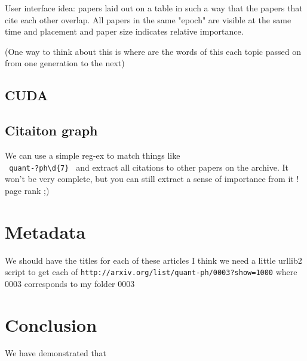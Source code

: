 \documentclass[11pt]{article}
\begin{document}
		User interface idea: papers laid out on a table in such a way that the papers that
		cite each other overlap. All papers in the same "epoch" are visible at the same time
		and placement and paper size indicates relative importance.
		
		(One way to think about this is where are the words of this each topic passed on from one generation
		to the next)
		 
		
	\subsection{CUDA }
			
    \subsection{Citaiton graph}
        We can use a simple reg-ex to match things like \\
        \verb| quant-?ph\d{7} | and extract all citations to other
        papers on the archive.
        It won't be very complete, but you can still extract a sense 
        of importance from it !
        page rank ;)

    \section{Metadata}
        We should have the titles for each of these articles I think
        we need a little urllib2 script to get each of
        \verb|http://arxiv.org/list/quant-ph/0003?show=1000|
        where 0003 corresponds to my folder 0003 


\section{Conclusion}

    We have demonstrated that     




\end{document}
